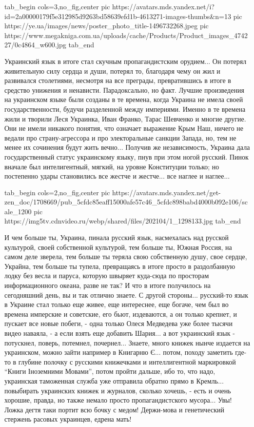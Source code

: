 \ifcmt
  tab_begin cols=3,no_fig,center
     pic https://avatars.mds.yandex.net/i?id=2a00000179f5e312985d9263bd58639efd1b-4613271-images-thumbs&n=13
     pic https://ye.ua/images/news/poster_photo_title-1496732268.jpeg
     pic https://www.megakniga.com.ua/uploads/cache/Products/Product_images_474227/0c4864_w600.jpg
  tab_end
\fi

Украинский язык в итоге стал скучным пропагандистским орудием... Он потерял
живительную силу сердца и души, потерял то, благодаря чему он жил и развивался
столетиями, несмотря на все преграды, превратившись в итоге в средство унижения
и ненависти. Парадоксально, но факт. Лучшие произведения на украинском языке
были созданы в те времена, когда Украина не имела своей государственности,
будучи разделенной между империями. Именно в те времена жили и творили Леся
Украинка, Иван Франко, Тарас Шевченко и многие другие. Они не имели никакого
понятия, что означает выражение Крым Наш, ничего не ведали про страну-агрессора
и про электоральные санкции Запада, но, тем не менее их сочинения будут жить
вечно... Получив же независимость, Украина дала государственный статус
украинскому языку, пнув при этом ногой русский. Пинок вначале был
интелигентный, мягкий, на уровне Конституции только; но постепенно удары
становились все жестче и жестче... все наглее и наглее... 

\ifcmt
  tab_begin cols=2,no_fig,center
     pic https://avatars.mds.yandex.net/get-zen_doc/1708669/pub_5cfdc85eaff15000afe57c46_5cfdc898babd4000b092e106/scale_1200
     pic https://img5tv.cdnvideo.ru/webp/shared/files/202104/1_1298133.jpg
  tab_end
\fi

И чем больше ты, Украина, пинала русский язык, насмехалась над русской
культурой, своей собственной культурой, тем больше ты, Южная Россия, на самом
деле зверела, тем больше ты теряла свою собственную душу, свое сердце, Украйна,
тем больше ты тупела, превращаясь в итоге просто в раздолбанную лодку без весла
и паруса, которую швыряет куда-сюда по просторам информационного океана, разве
не так? И что в итоге получилось на сегодняшний день, вы и так отлично знаете.
С другой стороны... русский-то язык в Украине стал только еще живее, еще
интереснее, еще богаче, чем был во времена имперские и советские, его бьют,
издеваются, а он только крепнет, и пускает все новые побеги, - одна только
Олеся Медведева уже более тысячи видео наваяла, - а если взять еще добавить
Шария... а вот украинский язык - потускнел, поверь, потемнел, почернел...
Знаете, много книжек нынче издается на украинском, можно зайти например в
Книгарню Є... потом, походу заметить где-то в глубине полочку с русскими
книжечками и интеллигентной маркировкой \enquote{Книги Іноземними Мовами},
потом пройти дальше, ибо то, что надо, украинская таможенная служба уже
отправила обратно прямо в Кремль... повыбирать украинских книжек и журналов,
сколько хочешь, - есть и очень хорошие, правда, но также немало просто
пропагандистского мусора...  Увы!  Ложка дегтя таки портит всю бочку с медом!
Держи-мова и генетический стержень расовых украинцев, едрена мать! 

